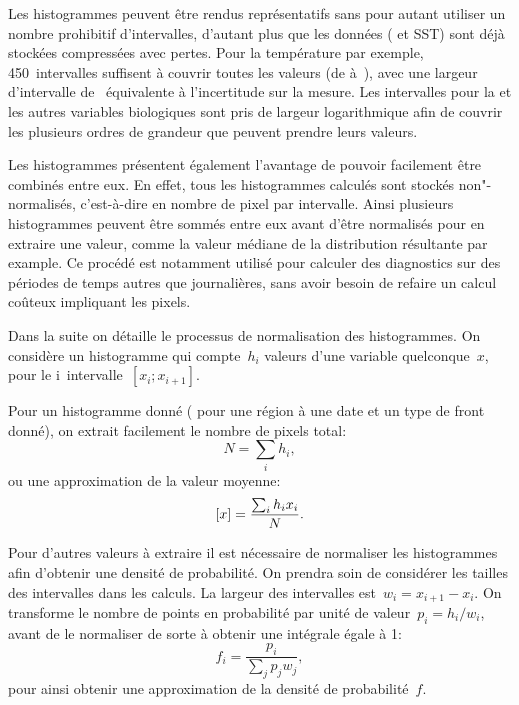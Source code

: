 Les histogrammes peuvent être rendus représentatifs sans pour autant utiliser un nombre prohibitif d'intervalles, d'autant plus que les données ( et SST) sont déjà stockées compressées avec pertes. Pour la température par exemple, 450~intervalles suffisent à couvrir toutes les valeurs (de  à~), avec une largeur d'intervalle de~ équivalente à l'incertitude sur la mesure.
Les intervalles pour la  et les autres variables biologiques sont pris de largeur logarithmique afin de couvrir les plusieurs ordres de grandeur que peuvent prendre leurs valeurs.

Les histogrammes présentent également l'avantage de pouvoir facilement être combinés entre eux.
En effet, tous les histogrammes calculés sont stockés non"-normalisés, c'est-à-dire en nombre de pixel par intervalle. Ainsi plusieurs histogrammes peuvent être sommés entre eux avant d'être normalisés pour en extraire une valeur, comme la valeur médiane de la distribution résultante par example.
Ce procédé est notamment utilisé pour calculer des diagnostics sur des périodes de temps autres que journalières, sans avoir besoin de refaire un calcul coûteux impliquant les pixels.

Dans la suite on détaille le processus de normalisation des histogrammes.
On considère un histogramme qui compte~\(h_i\) valeurs d'une variable quelconque~\(x\), pour le i\ieme{}~intervalle~\(\left[x_i; x_{i+1} \right]\).

Pour un histogramme donné ( pour une région à une date et un type de front donné), on extrait facilement le nombre de pixels total:
\begin{equation}
  N = \sum_i h_i,
\end{equation}
ou une approximation de la valeur moyenne:
\begin{equation}
  \left[x\right] = \frac{\sum_i h_i x_i} {N}.
\end{equation}

Pour d'autres valeurs à extraire il est nécessaire de normaliser les histogrammes afin d'obtenir une densité de probabilité. On prendra soin de considérer les tailles des intervalles dans les calculs.
La largeur des intervalles est~\(w_i = x_{i+1}-x_i\). On transforme le nombre de points en probabilité par unité de valeur~\(p_i = h_i / w_i \), avant de le normaliser de sorte à obtenir une intégrale égale à 1:
\begin{equation}
  f_i = \frac{p_i} {\sum_j p_j w_j},
\end{equation}
pour ainsi obtenir une approximation de la densité de probabilité~\(f\).

